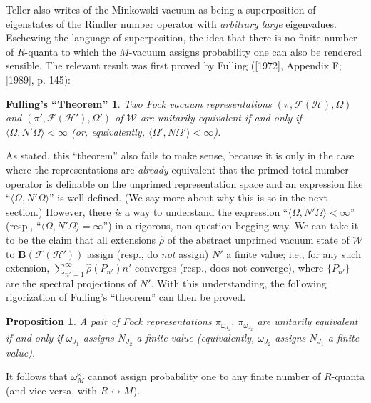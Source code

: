 \documentclass[12pt]{article}
\newtheorem{prop}{Proposition}
\newtheorem*{fulling}{Fulling's ``Theorem''}
\theoremstyle{remark}
\theoremstyle{definition}
\newcommand{\alg}[1]{\mathcal{#1}}
\newcommand{\hil}[1]{\mathcal{#1}}
\begin{document}
 Teller also writes of the Minkowski vacuum as being a superposition 
 of eigenstates of the Rindler number operator with 
 \emph{arbitrary large} eigenvalues.  Eschewing the language of 
 superposition, the idea that there is no finite number of $R$-quanta 
 to which the $M$-vacuum assigns probability one can also be 
 rendered sensible.  The relevant result was first proved by Fulling 
 ([1972], Appendix F; [1989], p. 145): 
 \begin{fulling} Two Fock vacuum representations
  $(\pi, \hil{F}(\hil{H}),\Omega)$ and $(\pi', 
  \hil{F}(\hil{H}'),\Omega')$ of $\alg{W}$ are unitarily equivalent 
  if and only if $\langle \Omega, 
  N'\Omega\rangle<\infty$ (or, equivalently, $\langle \Omega', 
  N\Omega'\rangle<\infty$).  \end{fulling}
  \noindent As stated, this ``theorem'' also fails to make 
  sense, because it is only in the case where the representations are 
  \emph{already} equivalent that  
   the primed total number operator is definable
  on the unprimed representation space and an expression like ``$\langle \Omega, 
  N'\Omega\rangle$'' is well-defined.  (We say more about why this is 
  so in the next section.) However, there \emph{is} a way to understand the 
  expression ``$\langle \Omega,N'\Omega\rangle<\infty$'' (resp., ``$\langle \Omega, 
  N'\Omega\rangle=\infty$'') in a rigorous, non-question-begging way.  
  We can take it to be 
  the claim that all extensions $\hat{\rho}$ of the 
  abstract unprimed vacuum state of $\alg{W}$
  to $\mathbf{B}(\hil{F}(\hil{H}'))$ assign (resp., do \emph{not} assign) $N'$ a finite
  value; i.e., for any such extension, $\sum_{n'=1}^{\infty}\hat{\rho}(P_{n'})n'$ converges 
  (resp., does not converge), 
  where $\{P_{n'}\}$ are the spectral projections of $N'$.  With this 
  understanding, the
  following rigorization of Fulling's ``theorem'' can then be proved.  
  
 \begin{prop}  \label{fulling} A pair of Fock representations
$\pi_{\omega_{J_{1}}}$, $\pi_{\omega_{J_{2}}}$ are unitarily 
equivalent if and only if
$\omega_{J_{1}}$ assigns $N_{J_{2}}$ a finite value (equivalently, 
$\omega_{J_{2}}$ assigns $N_{J_{1}}$ a finite value). 
\end{prop}
 
 \noindent It follows that $\omega_{M}^{\bowtie}$ cannot assign 
 probability one to any finite number of $R$-quanta (and vice-versa, with 
 $R\leftrightarrow M$).
    
\end{document}
